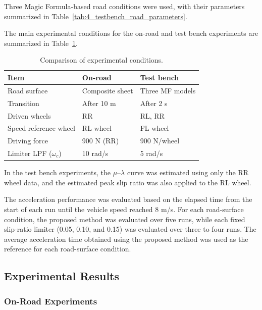 \documentclass[dvipdfmx,conference]{IEEEtran}
\begin{document}
Three Magic Formula-based road conditions were used, with their parameters summarized in Table~\ref{tab:4_testbench_road_parameters}.

The main experimental conditions for the on-road and test bench experiments are summarized in Table~\ref{tab:experimental_conditions}.

\begin{table}[t]
    \centering
    \caption{Comparison of experimental conditions.}
    \label{tab:experimental_conditions}
    \footnotesize
    \setlength{\tabcolsep}{2pt}
    \begin{tabular}{p{}p{}p{}}
        \hline
        Item & On-road & Test bench \\
        \hline
        Road surface
        & Composite sheet
        & Three MF models \\
        Transition
        & After 10 m
        & After 2 s \\
        Driven wheels
        & RR
        & RL, RR \\
        Speed reference wheel
        & RL wheel
        & FL wheel \\
        Driving force
        & 900 N (RR)
        & 900 N/wheel \\
        Limiter LPF ($\omega_c$)
        & 10 rad/s
        & 5 rad/s \\
        \hline
    \end{tabular}
\end{table}

In the test bench experiments, the $\mu$--$\lambda$ curve was estimated using only the RR wheel data, and the estimated peak slip ratio was also applied to the RL wheel.

The acceleration performance was evaluated based on the elapsed time from the start of each run until the vehicle speed reached 8 m/s.
For each road-surface condition, the proposed method was evaluated over five runs, while each fixed slip-ratio limiter (0.05, 0.10, and 0.15) was evaluated over three to four runs.
The average acceleration time obtained using the proposed method was used as the reference for each road-surface condition.

\subsection{Experimental Results}

\subsubsection{On-Road Experiments}
\end{document}
